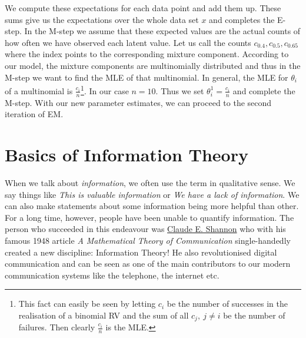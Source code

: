 We compute these expectations for each data point and add them up. These sums give us the expectations over the whole data set $ x $ and completes the E-step.
In the M-step we assume that these expected values are the actual counts of how often we have observed each latent value. Let us call the counts 
$ c_{0.4}, c_{0.5}, c_{0.65} $ where the index points to the corresponding mixture component. According to our model, the mixture components are multinomially
distributed and thus in the M-step we want to find the MLE of that multinomial. In general, the MLE for $ \theta_{i} $ of a multinomial is
$ \frac{c_{i}}{n} $\footnote{This fact can easily be seen by letting $ c_{i} $ be the number of successes in the realisation of a binomial RV and the sum of all
$ c_{j},~j \not = i $ be the number of failures. Then clearly $ \frac{c_{i}}{n} $ is the MLE.}. In our case $ n=10 $. Thus we set 
$ \theta_{i}^{1} = \frac{c_{i}}{n} $ and complete the M-step. With our new parameter estimates, we can proceed to the second iteration of EM. \bigskip

%


\section{Basics of Information Theory}

When we talk about \textit{information}, we often use the term in qualitative sense. We say things like 
\textit{This is valuable information} or 
\textit{We have a lack of information}. We can also make statements about some information being more helpful than other. For a long time, however,
people have been unable to quantify information. The person who succeeded in this endeavour was \href{https://en.wikipedia.org/wiki/Claude_Shannon}{Claude E. Shannon}
who with his famous 1948 article \textit{A Mathematical Theory of Communication} single-handedly created a new discipline: Information Theory! He also revolutionised
digital communication and can be seen as one of the main contributors to our modern communication systems like the telephone, the internet etc. 

